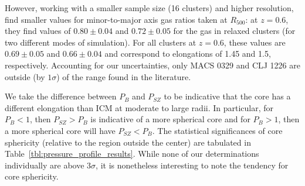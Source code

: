 \documentclass[iop,numberedappendix,apj]{emulateapj}
\begin{document}
However, working with a smaller sample size (16 clusters) and higher resolution, 
\citet{lau2011} find smaller values for minor-to-major axis gas ratios taken at $R_{500}$: 
at $z=0.6$, they find values of $0.80 \pm 0.04$ and $0.72 \pm 0.05$ for the gas in relaxed clusters 
(for two different modes of simulation). For all clusters at $z = 0.6$, these values are $0.69 \pm 0.05$ and
$0.66 \pm 0.04$ and correspond to elongations of 1.45 and 1.5, respectively. Accounting for our
uncertainties, only MACS 0329 and CLJ 1226 are outside (by $1\sigma$) of the range found in the literature.

We take the difference between $P_{B}$ and $P_{SZ}$ to be indicative that the core has a different elongation
than ICM at moderate to large radii. In particular, for $P_{B} < 1$, then $P_{SZ} > P_{B}$ is indicative of a
more spherical core and for $P_{B} > 1$, then a more spherical core will have $P_{SZ} < P_{B}$. The statistical
significances of core sphericity (relative to the region outside the center) are tabulated in 
Table~\ref{tbl:pressure_profile_results}. While none of our determinations individually are above $3\sigma$, 
it is nonetheless interesting to note the tendency for core sphericity.


\end{document}
